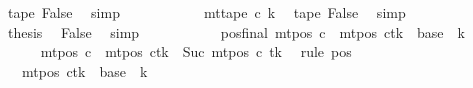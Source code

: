\begin{isabellebody}
\ tape{}\ False\ \isamarkupfalse%
\ simp\isanewline
\ \ \ \ \ \ \isamarkupfalse%
\ \isamarkupfalse%
\ {\isachardoublequoteopen}{\isasymdots}\ {\isacharequal}{\kern0pt}\ mt{\isacharunderscore}{\kern0pt}tape\ c{\isacharprime}{\kern0pt}\ k{\isacharprime}{\kern0pt}{\isachardoublequoteclose}\ \isamarkupfalse%
\ tape{}\ False\ \isamarkupfalse%
\ simp\isanewline
\ \ \ \ \ \ \isamarkupfalse%
\ \isamarkupfalse%
\ {\isacharquery}{\kern0pt}thesis\ \isamarkupfalse%
\ False\ \isamarkupfalse%
\ simp\isanewline
\ \ \ \ \isamarkupfalse%
\isanewline
\ \ \isamarkupfalse%
\isanewline
\ \ \isamarkupfalse%
\ pos{\isacharunderscore}{\kern0pt}final{\isacharcolon}{\kern0pt}\ {\isachardoublequoteopen}mt{\isacharunderscore}{\kern0pt}pos\ c{}\ {\isacharequal}{\kern0pt}\ {\isacharparenleft}{\kern0pt}mt{\isacharunderscore}{\kern0pt}pos\ c{\isacharprime}{\kern0pt}{\isacharparenright}{\kern0pt}{\isacharparenleft}{\kern0pt}tk\ {\isacharcolon}{\kern0pt}{\isacharequal}{\kern0pt}\ base\ {\isacharplus}{\kern0pt}\ {\isacharquery}{\kern0pt}k{\isacharparenright}{\kern0pt}{\isachardoublequoteclose}\isanewline
\ \ \isamarkupfalse%
\ {\isacharminus}{\kern0pt}\isanewline
\ \ \ \ \isamarkupfalse%
\ {\isachardoublequoteopen}mt{\isacharunderscore}{\kern0pt}pos\ c{}\ {\isacharequal}{\kern0pt}\ {\isacharparenleft}{\kern0pt}mt{\isacharunderscore}{\kern0pt}pos\ c{}{\isacharparenright}{\kern0pt}{\isacharparenleft}{\kern0pt}tk\ {\isacharcolon}{\kern0pt}{\isacharequal}{\kern0pt}\ Suc\ {\isacharparenleft}{\kern0pt}mt{\isacharunderscore}{\kern0pt}pos\ c{}\ tk{\isacharparenright}{\kern0pt}{\isacharparenright}{\kern0pt}{\isachardoublequoteclose}\ \isamarkupfalse%
\ {\isacharparenleft}{\kern0pt}rule\ pos{}{\isacharparenright}{\kern0pt}\isanewline
\ \ \ \ \isamarkupfalse%
\ \isamarkupfalse%
\ {\isachardoublequoteopen}{\isasymdots}\ {\isacharequal}{\kern0pt}\ {\isacharparenleft}{\kern0pt}mt{\isacharunderscore}{\kern0pt}pos\ c{}{\isacharparenright}{\kern0pt}{\isacharparenleft}{\kern0pt}tk\ {\isacharcolon}{\kern0pt}{\isacharequal}{\kern0pt}\ base\ {\isacharplus}{\kern0pt}\ {\isacharquery}{\kern0pt}k{\isacharparenright}{\kern0pt}{\isachardoublequoteclose}\ \isamarkupfalse%

\end{isabellebody}
